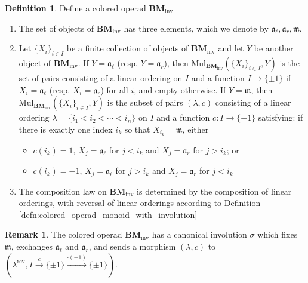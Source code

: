 \documentclass{article}
\theoremstyle{definition}
\newtheorem{definition}[equation]{Definition}
\newtheorem{remark}[equation]{Remark}
\begin{document}
\begin{definition}\label{defn:inv_bimod_operad}
    Define a colored operad $ \mathbf{BM}_\mathrm{inv} $
    \begin{enumerate}[label=(\roman*)]
        \item The set of objects of $ \mathbf{BM}_\mathrm{inv} $ has three elements, which we denote by $ \mathfrak{a}_\ell, \mathfrak{a}_r, \mathfrak{m} $. 
        \item Let $ \{X_i\}_{i \in I} $ be a finite collection of objects of $ \mathbf{BM}_{\mathrm{inv}} $ and let $ Y $ be another object of $ \mathbf{BM}_{\mathrm{inv}} $. 
        If $ Y = \mathfrak{a}_\ell $ (resp. $ Y = \mathfrak{a}_r $), then $ \mathrm{Mul}_{\mathbf{BM}_\mathrm{inv}} \left(\{X_i\}_{i \in I}, Y\right) $ is the set of pairs consisting of a linear ordering on $ I $ and a function $ I \to \{\pm 1\} $ if $ X_i = \mathfrak{a}_\ell $ (resp. $ X_i = \mathfrak{a}_r $) for all $ i $, and empty otherwise. 
        If $ Y = \mathfrak{m} $, then $ \mathrm{Mul}_{\mathbf{BM}_\mathrm{inv}} \left(\{X_i\}_{i \in I}, Y\right) $ is the subset of pairs $ (\lambda, c) $ consisting of a linear ordering $ \lambda = \{i_1 < i_2 < \cdots < i_n\} $ on $ I $ and a function $ c \colon I \to \{\pm 1 \} $ satisfying: if  there is exactly one index $ i_k $ so that $ X_{i_k} = \mathfrak{m} $, either
        \begin{itemize}
            \item $ c(i_k) = 1 $, $ X_{j} = \mathfrak{a}_\ell $ for $ j < i_k $ and $ X_j = \mathfrak{a}_{r} $ for $ j > i_k $; or
            \item $ c(i_k) = - 1 $, $ X_{j} = \mathfrak{a}_\ell $ for $ j > i_k $ and $ X_j = \mathfrak{a}_{r} $ for $ j < i_k $ 
        \end{itemize}
        \item The composition law on $ \mathbf{BM}_{\mathrm{inv}} $ is determined by the composition of linear orderings, with reversal of linear orderings according to Definition \ref{defn:colored_operad_monoid_with_involution} 
    \end{enumerate}
\end{definition} 
\begin{remark}\label{rmk:bimod_opd_involution}
    The colored operad $ \mathbf{BM}_{\mathrm{inv}} $ has a canonical involution $ \sigma $ which fixes $ \mathfrak{m} $, exchanges $ \mathfrak{a}_\ell $ and $ \mathfrak{a}_r $, and sends a morphism $ (\lambda, c) $ to $ (\lambda^{\mathrm{rev}}, I \xrightarrow{c} \{\pm 1\} \xrightarrow{\cdot (-1)} \{\pm 1 \}) $. 
\end{remark}
\end{document}
